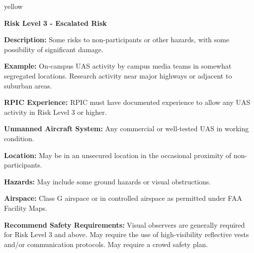 \documentclass[
]{book}
\newenvironment{content}{\hrulefill}{}{}
\newenvironment{titleB}{}{}
\begin{document}
\begin{content-box}{yellow}

\begin{titleB}

\textbf{Risk Level 3 - Escalated Risk}

\end{titleB}

\begin{content}

\textbf{Description:} Some risks to non-participants or other hazards, with some possibility of significant damage.

\textbf{Example:} On-campus UAS activity by campus media teams in somewhat segregated locations. Research activity near major highways or adjacent to suburban areas.

\textbf{RPIC Experience:} RPIC must have documented experience to allow any UAS activity in Risk Level 3 or higher.

\textbf{Unmanned Aircraft System:} Any commercial or well-tested UAS in working condition.

\textbf{Location:} May be in an unsecured location in the occasional proximity of non-participants.

\textbf{Hazards:} May include some ground hazards or visual obstructions.

\textbf{Airspace:} Class G airspace or in controlled airspace as permitted under FAA Facility Maps.

\textbf{Recommend Safety Requirements:} Visual observers are generally required for Risk Level 3 and above. May require the use of high-visibility reflective vests and/or communication protocols. May require a crowd safety plan.

\end{content}

\end{content-box}
\end{document}
